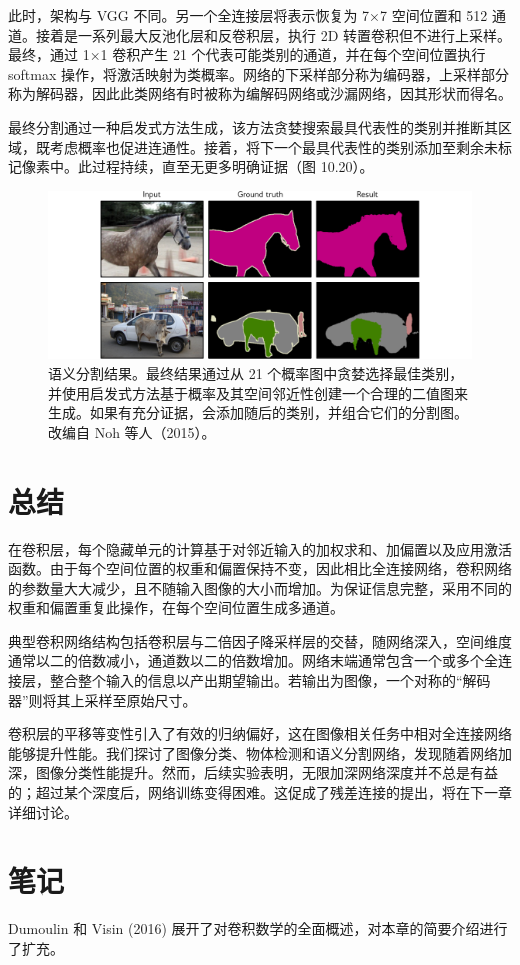 此时，架构与 VGG 不同。另一个全连接层将表示恢复为 7×7 空间位置和 512 通道。接着是一系列最大反池化层和反卷积层，执行 2D 转置卷积但不进行上采样。最终，通过 1×1 卷积产生 21 个代表可能类别的通道，并在每个空间位置执行 softmax 操作，将激活映射为类概率。网络的下采样部分称为编码器，上采样部分称为解码器，因此此类网络有时被称为编解码网络或沙漏网络，因其形状而得名。

最终分割通过一种启发式方法生成，该方法贪婪搜索最具代表性的类别并推断其区域，既考虑概率也促进连通性。接着，将下一个最具代表性的类别添加至剩余未标记像素中。此过程持续，直至无更多明确证据（图 10.20）。

\begin{figure}[ht!]
	\centering
	\includegraphics[width=0.7\linewidth]{png/chapter10/ConvSemSegResults.png}
	\caption{语义分割结果。最终结果通过从 21 个概率图中贪婪选择最佳类别，并使用启发式方法基于概率及其空间邻近性创建一个合理的二值图来生成。如果有充分证据，会添加随后的类别，并组合它们的分割图。改编自 Noh 等人（2015）。}
\end{figure}

\section{总结}
在卷积层，每个隐藏单元的计算基于对邻近输入的加权求和、加偏置以及应用激活函数。由于每个空间位置的权重和偏置保持不变，因此相比全连接网络，卷积网络的参数量大大减少，且不随输入图像的大小而增加。为保证信息完整，采用不同的权重和偏置重复此操作，在每个空间位置生成多通道。

典型卷积网络结构包括卷积层与二倍因子降采样层的交替，随网络深入，空间维度通常以二的倍数减小，通道数以二的倍数增加。网络末端通常包含一个或多个全连接层，整合整个输入的信息以产出期望输出。若输出为图像，一个对称的“解码器”则将其上采样至原始尺寸。

卷积层的平移等变性引入了有效的归纳偏好，这在图像相关任务中相对全连接网络能够提升性能。我们探讨了图像分类、物体检测和语义分割网络，发现随着网络加深，图像分类性能提升。然而，后续实验表明，无限加深网络深度并不总是有益的；超过某个深度后，网络训练变得困难。这促成了残差连接的提出，将在下一章详细讨论。

\section{笔记}
Dumoulin 和 Visin (2016) 展开了对卷积数学的全面概述，对本章的简要介绍进行了扩充。

